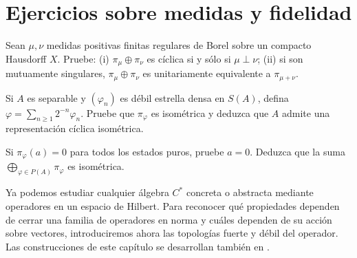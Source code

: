 \section{Ejercicios sobre medidas y fidelidad}

\begin{ejercicio}\label{ej:v3-l30-1}
Sean $\mu,\nu$ medidas positivas finitas regulares de Borel sobre un compacto Hausdorff $X$. Pruebe: (i) $\pi_\mu\oplus\pi_\nu$ es cíclica si y sólo si $\mu\perp\nu$; (ii) si son mutuamente singulares, $\pi_\mu\oplus\pi_\nu$ es unitariamente equivalente a $\pi_{\mu+\nu}$.
\end{ejercicio}


\begin{ejercicio}\label{ej:v3-l30-2}
Si $A$ es separable y $(\varphi_n)$ es débil estrella densa en $S(A)$, defina $\varphi=\sum_{n\ge1}2^{-n}\varphi_n$. Pruebe que $\pi_\varphi$ es isométrica y deduzca que $A$ admite una representación cíclica isométrica.
\end{ejercicio}


\begin{ejercicio}\label{ej:v3-l30-3}
Si $\pi_\varphi(a)=0$ para todos los estados puros, pruebe $a=0$. Deduzca que la suma $\bigoplus_{\varphi\in P(A)}\pi_\varphi$ es isométrica.
\end{ejercicio}


Ya podemos estudiar cualquier álgebra $C^*$ concreta o abstracta mediante operadores en un espacio de Hilbert. Para reconocer qué propiedades dependen de cerrar una familia de operadores en norma y cuáles dependen de su acción sobre vectores, introduciremos ahora las topologías fuerte y débil del operador. Las construcciones de este capítulo se desarrollan también en \cite{murphy1990,zhu1993,conway1990}.
